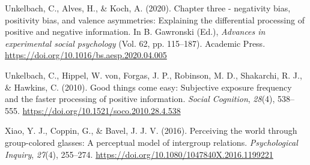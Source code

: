 \documentclass[
  man]{apa6}
\newlength{\cslhangindent}
\newlength{\cslentryspacingunit} %
\newenvironment{CSLReferences}[2] %
 {%
  \setlength{\parindent}{0pt}
  \ifodd #1
  \let\oldpar\par
  \def\par{\hangindent=\cslhangindent\oldpar}
  \fi
  \setlength{\parskip}{#2\cslentryspacingunit}
 }%
 {}
\begin{document}
\begin{CSLReferences}{1}{0}
\leavevmode{}%
Unkelbach, C., Alves, H., \& Koch, A. (2020). Chapter three - negativity bias, positivity bias, and valence asymmetries: Explaining the differential processing of positive and negative information. In B. Gawronski (Ed.), \emph{Advances in experimental social psychology} (Vol. 62, pp. 115--187). Academic Press. \url{https://doi.org/10.1016/bs.aesp.2020.04.005}

\leavevmode{}%
Unkelbach, C., Hippel, W. von, Forgas, J. P., Robinson, M. D., Shakarchi, R. J., \& Hawkins, C. (2010). Good things come easy: Subjective exposure frequency and the faster processing of positive information. \emph{Social Cognition}, \emph{28}(4), 538--555. \url{https://doi.org/10.1521/soco.2010.28.4.538}

\leavevmode{}%
Xiao, Y. J., Coppin, G., \& Bavel, J. J. V. (2016). Perceiving the world through group-colored glasses: A perceptual model of intergroup relations. \emph{Psychological Inquiry}, \emph{27}(4), 255--274. \url{https://doi.org/10.1080/1047840X.2016.1199221}

\end{CSLReferences}

\endgroup
\end{document}
